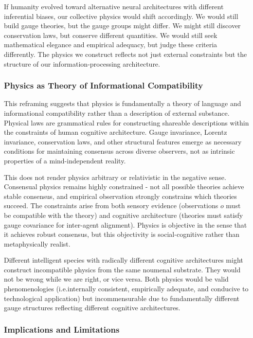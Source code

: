 \documentclass[11pt]{article}
\begin{document}
If humanity evolved toward alternative neural architectures with different inferential biases, our collective physics would shift accordingly. We would still build gauge theories, but the gauge groups might differ. We might still discover conservation laws, but conserve different quantities. We would still seek mathematical elegance and empirical adequacy, but judge these criteria differently. The physics we construct reflects not just external constraints but the structure of our information-processing architecture.

\subsubsection{Physics as Theory of Informational Compatibility}

This reframing suggests that physics is fundamentally a theory of language and informational compatibility rather than a description of external substance. Physical laws are grammatical rules for constructing shareable descriptions within the constraints of human cognitive architecture. Gauge invariance, Lorentz invariance, conservation laws, and other structural features emerge as necessary conditions for maintaining consensus across diverse observers, not as intrinsic properties of a mind-independent reality.

This does not render physics arbitrary or relativistic in the negative sense. Consensual physics remains highly constrained - not all possible theories achieve stable consensus, and empirical observation strongly constrains which theories succeed. The constraints arise from both sensory evidence (observations $o$ must be compatible with the theory) and cognitive architecture (theories must satisfy gauge covariance for inter-agent alignment). Physics is objective in the sense that it achieves robust consensus, but this objectivity is social-cognitive rather than metaphysically realist.

Different intelligent species with radically different cognitive architectures might construct incompatible physics from the same noumenal substrate. They would not be wrong while we are right, or vice versa. Both physics would be valid phenomenologies (i.e.internally consistent, empirically adequate, and conducive to technological application) but incommensurable due to fundamentally different gauge structures reflecting different cognitive architectures.

\subsubsection{Implications and Limitations}
\end{document}
